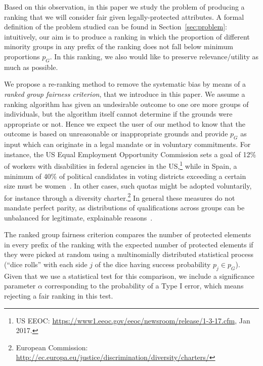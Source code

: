 Based on this observation, in this paper we study the problem of producing a ranking that we will consider fair given legally-protected attributes.
%
A formal definition \textcolor[rgb]{0.00,0.00,1.00}{of the problem studied} can be found in Section~\ref{sec:problem}: \textcolor[rgb]{0.00,0.00,1.00}{intuitively, our aim is} to produce a ranking in which the proportion of different minority groups in any prefix of the ranking does not fall below minimum proportions $p_G$. In this ranking, we also would like to preserve relevance/utility as much as possible.
%

We propose a \textcolor[rgb]{0.00,0.07,1.00}{re-ranking} method to remove the systematic bias by means of a \emph{ranked group fairness criterion}, that we introduce in this paper.
%
We assume a ranking algorithm has given an undesirable outcome to one ore more groups of individuals, but the algorithm itself cannot determine if the grounds were appropriate or not.
%
Hence we expect the user of our method to know that the outcome is based on unreasonable or inappropriate grounds and provide $p_G$ as input which can originate in a legal mandate or in voluntary commitments.
%
For instance, the US Equal Employment Opportunity Commission sets a goal of 12\% of workers with disabilities in federal agencies in the US,\footnote{US EEOC: \url{https://www1.eeoc.gov/eeoc/newsroom/release/1-3-17.cfm}, Jan 2017.}
%
while in Spain, a minimum of 40\% of political candidates in voting districts exceeding a certain size must be women~\cite{verge2010gendering}.
%
In other cases, such quotas might be adopted voluntarily, for instance through a diversity charter.\footnote{European Commission: \url{http://ec.europa.eu/justice/discrimination/diversity/charters/}}
%
In general these measures do not mandate perfect parity, as distributions of qualifications across groups can be unbalanced for legitimate, explainable reasons~\cite{zliobaite2011handling,pedreschi2009integrating}. %


The ranked group fairness criterion compares the number of protected elements in every prefix of the ranking with the expected number of protected elements if they were picked at random using a multinomially distributed statistical process (``dice rolls'' with each side $ j $ of the dice having success probability $p_j \in p_G$).
%
Given that we use a statistical test for this comparison, we include a significance parameter $\alpha$ corresponding to the probability of a Type I error, which means rejecting a fair ranking in this test.

